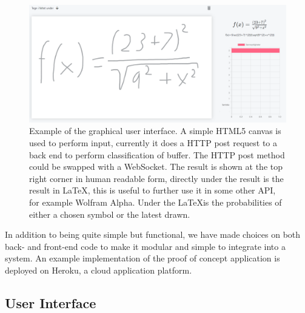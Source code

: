 % 
\begin{figure}[H]
    \centering
    \includegraphics[width=\textwidth]{Assets/Chapter4_Result/predictor_example.png}
    \caption{Example of the graphical user interface. A simple HTML5 canvas is used to perform input, currently it does a HTTP post request to a back end to perform classification of buffer. The HTTP post method could be swapped with a WebSocket. The result is shown at the top right corner in human readable form, directly under the result is the result in \LaTeX, this is useful to further use it in some other API, for example Wolfram Alpha. Under the \LaTeX  is the probabilities of either a chosen symbol or the latest drawn.}
    \label{fig:predictor_example}
\end{figure}
In addition to being quite simple but functional, we have made choices on both back- and front-end code to make it modular and simple to integrate into a system. An example implementation of the proof of concept application is deployed on Heroku, a cloud application platform.

\subsection{User Interface}




